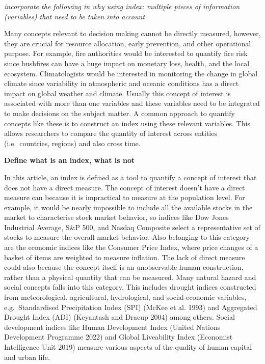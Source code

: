 \documentclass[
]{article}
\begin{document}
\emph{incorporate the following in why using index: multiple pieces of
information (variables) that need to be taken into account}

Many concepts relevant to decision making cannot be directly measured,
however, they are crucial for resource allocation, early prevention, and
other operational purpose. For example, fire authorities would be
interested to quantify fire risk since bushfires can have a huge impact
on monetary loss, health, and the local ecosystem. Climatologists would
be interested in monitoring the change in global climate since
variability in atmospheric and oceanic conditions has a direct impact on
global weather and climate. Usually this concept of interest is
associated with more than one variables and these variables need to be
integrated to make decisions on the subject matter. A common approach to
quantify concepts like these is to construct an index using these
relevant variables. This allows researchers to compare the quantity of
interest across entities (i.e.~countries, regions) and also cross time.

\textbf{Define what is an index, what is not}

In this article, an index is defined as a tool to quantify a concept of
interest that does not have a direct measure. The concept of interest
doesn't have a direct measure can because it is impractical to measure
at the population level. For example, it would be nearly impossible to
include all the available stocks in the market to characterise stock
market behavior, so indices like Dow Jones Industrial Average, S\&P 500,
and Nasdaq Composite select a representative set of stocks to measure
the overall market behavior. Also belonging to this category are the
economic indices like the Consumer Price Index, where price changes of a
basket of items are weighted to measure inflation. The lack of direct
measure could also because the concept itself is an unobservable human
construction, rather than a physical quantity that can be measured. Many
natural hazard and social concepts falls into this category. This
includes drought indices constructed from meteorological, agricultural,
hydrological, and social-economic variables, e.g.~Standardised
Precipitation Index (SPI) (McKee et al. 1993) and Aggregated Drought
Index (ADI) (Keyantash and Dracup 2004) among others. Social development
indices like Human Development Index (United Nations Development
Programme 2022) and Global Liveability Index (Economist Intelligence
Unit 2019) measure various aspects of the quality of human capital and
urban life.
\end{document}
